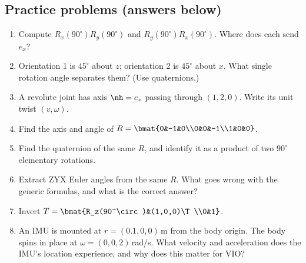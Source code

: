 \subsection{Practice problems (answers below)}\label{sec:rot:practice-problems-answers}
\begin{enumerate}[label=\textbf{P\arabic*.},itemsep=2pt]
\item Compute $R_x(90^\circ)R_y(90^\circ)$ and $R_y(90^\circ)R_x(90^\circ)$. Where does each send $e_x$?
\item Orientation 1 is $45^\circ$ about $z$; orientation 2 is $45^\circ$ about $x$. What single rotation angle separates them? (Use quaternions.)
\item A revolute joint has axis $\nh=e_z$ passing through $(1,2,0)$. Write its unit twist $(v,\omega)$.
\item Find the axis and angle of $R=\bmat{0&-1&0\\0&0&-1\\1&0&0}$.
\item Find the quaternion of the same $R$, and identify it as a product of two $90^\circ$ elementary rotations.
\item Extract ZYX Euler angles from the same $R$. What goes wrong with the generic formulas, and what is the correct answer?
\item Invert $T=\bmat{R_z(90^\circ)&(1,0,0)\T\\0&1}$.
\item An IMU is mounted at $r=(0.1,0,0)$\,m from the body origin. The body spins in place at $\omega=(0,0,2)$\,rad/s. What velocity and acceleration does the IMU's location experience, and why does this matter for VIO?
\end{enumerate}

